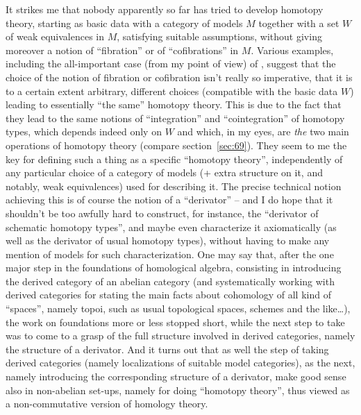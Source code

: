 It strikes me that nobody apparently so far has tried to develop
homotopy theory, starting as basic data with a category of models $M$
together with a set $W$ of weak equivalences in $M$, satisfying
suitable assumptions, without giving moreover a notion of
``fibration'' or of ``cofibrations'' in $M$. Various examples,
including the all-important case (from my point of view) of \Cat,
suggest that the choice of the notion of fibration or cofibration
isn't really so imperative, that it is to a certain extent arbitrary,
different choices (compatible with the basic data $W$) leading to
essentially ``the same'' homotopy theory. This is due to the fact that
they lead to the same notions of ``integration'' and ``cointegration''
of homotopy types, which depends indeed only on $W$ and which, in my
eyes, are \emph{the} two main operations of homotopy theory (compare
section~\ref{sec:69}). They seem to me the key for defining such a
thing as a specific ``homotopy theory'', independently of any
particular choice of a category of models (+ extra structure on it,
and notably, weak equivalences) used for describing it. The precise
technical notion achieving this is of course the notion of a
``derivator'' -- and I do hope that it shouldn't be too awfully hard
to construct, for instance, the ``derivator of schematic homotopy
types'', and maybe even characterize it axiomatically (as well as the
derivator of usual homotopy types), without having to make any mention
of models for such characterization. One may say that, after the one
major step in the foundations of homological algebra, consisting in
introducing the derived category of an abelian category (and
systematically working with derived categories for stating the main
facts about cohomology of all kind of ``spaces'', namely topoi, such
as usual topological spaces, schemes and the like\dots), the work on
foundations more or less stopped short, while the next step to take
was to come to a grasp of the full structure involved in derived
categories, namely the structure of a derivator. And it turns out that
as well the step of taking derived categories (namely localizations of
suitable model categories), as the next, namely introducing the
corresponding structure of a derivator, make good sense also in
non-abelian set-ups, namely for doing ``homotopy theory'', thus viewed
as a non-commutative version of homology theory.

